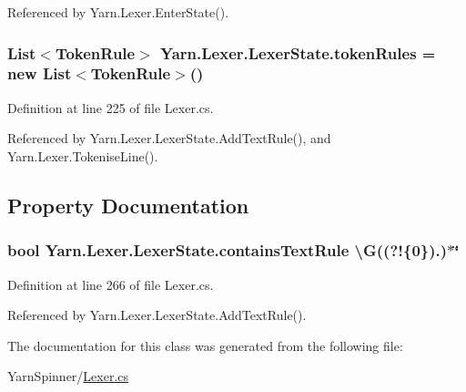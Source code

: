 Referenced by Yarn.\-Lexer.\-Enter\-State().

\hypertarget{a00130_adf6563b1dc6f3ef80ed13c2b15b7be03}{
\subsubsection[{token\-Rules}]{\setlength{\rightskip}{0pt plus 5cm}List$<${\bf Token\-Rule}$>$ Yarn.\-Lexer.\-Lexer\-State.\-token\-Rules = new List$<${\bf Token\-Rule}$>$()}}\label{a00130_adf6563b1dc6f3ef80ed13c2b15b7be03}


Definition at line 225 of file Lexer.\-cs.



Referenced by Yarn.\-Lexer.\-Lexer\-State.\-Add\-Text\-Rule(), and Yarn.\-Lexer.\-Tokenise\-Line().



\subsection{Property Documentation}
\hypertarget{a00130_a69948f05c35eeae9cb8448c849a053e6}{
\subsubsection[{contains\-Text\-Rule}]{\setlength{\rightskip}{0pt plus 5cm}bool Yarn.\-Lexer.\-Lexer\-State.\-contains\-Text\-Rule \textbackslash{}G((?!\{0\}).)$\ast$\char`\"{}\hspace{0.3cm}{\ttfamily [get]}}}\label{a00130_a69948f05c35eeae9cb8448c849a053e6}


Definition at line 266 of file Lexer.\-cs.



Referenced by Yarn.\-Lexer.\-Lexer\-State.\-Add\-Text\-Rule().



The documentation for this class was generated from the following file\-:\begin{DoxyCompactItemize}
\item 
Yarn\-Spinner/\hyperlink{a00313}{Lexer.\-cs}\end{DoxyCompactItemize}

